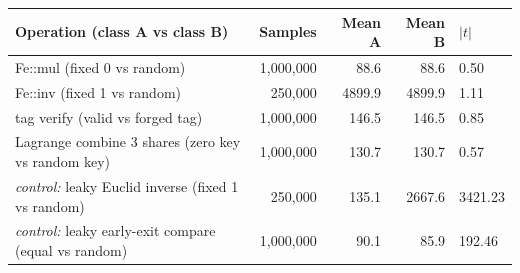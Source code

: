 \begin{tabular}{@{}lrrrl@{}}
\toprule
Operation (class A vs class B) & Samples & Mean A & Mean B & $|t|$ \\
\midrule
Fe::mul (fixed 0 vs random) & 1{,}000,000 & 88.6 & 88.6 & 0.50 \\
Fe::inv (fixed 1 vs random) & 250{,}000 & 4899.9 & 4899.9 & 1.11 \\
tag verify (valid vs forged tag) & 1{,}000,000 & 146.5 & 146.5 & 0.85 \\
Lagrange combine 3 shares (zero key vs random key) & 1{,}000,000 & 130.7 & 130.7 & 0.57 \\
\emph{control:} leaky Euclid inverse (fixed 1 vs random) & 250{,}000 & 135.1 & 2667.6 & 3421.23 \\
\emph{control:} leaky early-exit compare (equal vs random) & 1{,}000,000 & 90.1 & 85.9 & 192.46 \\
\bottomrule
\end{tabular}
